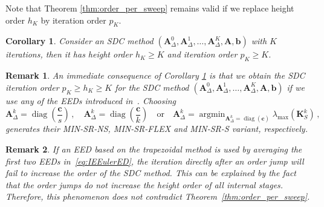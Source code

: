 \documentclass[sn-mathphys-num]{sn-jnl}%
\newcommand{\reva}[1]{#1}%
\DeclareMathOperator{\diag}{diag}
\theoremstyle{thmstyleone}%
\newtheorem{corollary}{Corollary}%
\theoremstyle{thmstyletwo}%
\newtheorem{remark}{Remark}%
\theoremstyle{thmstylethree}%
\DeclareMathOperator*{\argmin}{argmin}
\begin{document}
Note that Theorem \ref{thm:order_per_sweep} remains valid if we replace height order $h_K$ by \reva{iteration} order $p_K$. 
\begin{corollary}
    \label{corr:hk=K}
    Consider an SDC method $(\bm{A}_\Delta^0, \bm{A}_{\Delta}^1, \ldots, \bm{A}_{\Delta}^K, \bm{A}, \bm{b})$ with $K$ iterations, then it has height order $h_K \geq K$ and \reva{iteration} order $p_K \geq K$.
\end{corollary}

\begin{remark}
\reva{An immediate consequence of Corollary \ref{corr:hk=K} is that we obtain the SDC iteration order $p_K \geq h_K \geq K$ for the SDC method $(\bm{A}_\Delta^0, \bm{A}_{\Delta}^1, \ldots, \bm{A}_{\Delta}^K, \bm{A}, \bm{b})$ if we use any of the EEDs introduced in~\citep{CaklovicEtAl2025}.
Choosing
    \begin{equation}
        \label{eq:Caklovic_EEDs}
        \bm{A}_{\Delta}^k = \diag(\frac{\bm{c}}{s}) \,, \quad \bm{A}_{\Delta}^k = \diag(\frac{\bm{c}}{k}) \quad \text{or} \quad \bm{A}_{\Delta}^k = \argmin_{\bm{A}_\Delta^k = \diag(\hat{\bm{c}})} \lambda_{\max}(\bm{K}^k_S) \,,
    \end{equation}
    generates their MIN-SR-NS, MIN-SR-FLEX and MIN-SR-S variant, respectively.}
\end{remark}

\begin{remark}
    \label{rmk:trap_order_jump_Lobatto}
    If an EED based on the trapezoidal method is used by averaging the first two EEDs in~\eqref{eq:IEEulerED}, the iteration directly after an order jump will fail to increase the order of the SDC method. This can be explained by the fact that the order jumps do not increase the height order of all internal stages. Therefore, this phenomenon does not contradict Theorem~\ref{thm:order_per_sweep}.
\end{remark}
\end{document}
